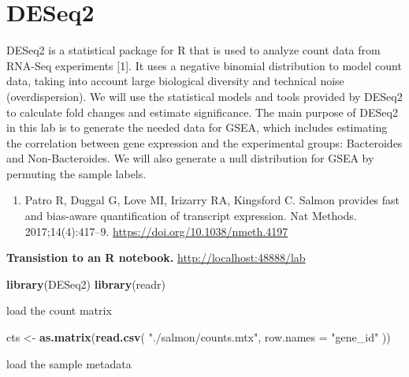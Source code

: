 \documentclass[
]{book}
\newenvironment{Shaded}{\begin{snugshade}}{\end{snugshade}}
\newcommand{\AttributeTok}[1]{\textcolor[rgb]{0.13,0.29,0.53}{#1}}
\newcommand{\FunctionTok}[1]{\textcolor[rgb]{0.13,0.29,0.53}{\textbf{#1}}}
\newcommand{\NormalTok}[1]{#1}
\newcommand{\OtherTok}[1]{\textcolor[rgb]{0.56,0.35,0.01}{#1}}
\newcommand{\SpecialCharTok}[1]{\textcolor[rgb]{0.81,0.36,0.00}{\textbf{#1}}}
\newcommand{\StringTok}[1]{\textcolor[rgb]{0.31,0.60,0.02}{#1}}
\providecommand{\tightlist}{%
  \setlength{\itemsep}{0pt}\setlength{\parskip}{0pt}}
\begin{document}
\section{DESeq2}\label{deseq2}

DESeq2 is a statistical package for R that is used to analyze count data from RNA-Seq experiments {[}1{]}.
It uses a negative binomial distribution to model count data, taking into account large biological diversity and technical noise
(overdispersion). We will use the statistical models and tools provided by DESeq2 to calculate fold changes and estimate significance.
The main purpose of DESeq2 in this lab is to generate the needed data for GSEA, which includes estimating the correlation between
gene expression and the experimental groups: Bacteroides and Non-Bacteroides. We will also generate a null distribution for
GSEA by permuting the sample labels.

\begin{enumerate}
\def\labelenumi{\arabic{enumi}.}
\tightlist
\item
  Patro R, Duggal G, Love MI, Irizarry RA, Kingsford C. Salmon provides fast and bias-aware quantification of transcript expression. Nat Methods. 2017;14(4):417--9. \url{https://doi.org/10.1038/nmeth.4197}
\end{enumerate}

\textbf{Transistion to an R notebook.}
\url{http://localhost:48888/lab}

\begin{Shaded}
\begin{Highlighting}[numbers=left,,]
\FunctionTok{library}\NormalTok{(DESeq2)}
\FunctionTok{library}\NormalTok{(readr)}
\end{Highlighting}
\end{Shaded}

load the count matrix

\begin{Shaded}
\begin{Highlighting}[numbers=left,,]
\NormalTok{cts }\OtherTok{\textless{}{-}} \FunctionTok{as.matrix}\NormalTok{(}\FunctionTok{read.csv}\NormalTok{(}
    \StringTok{"./salmon/counts.mtx"}\NormalTok{,}
    \AttributeTok{row.names =} \StringTok{"gene\_id"}
\NormalTok{))}
\end{Highlighting}
\end{Shaded}

load the sample metadata

\begin{Shaded}
\end{Shaded}
\end{document}
